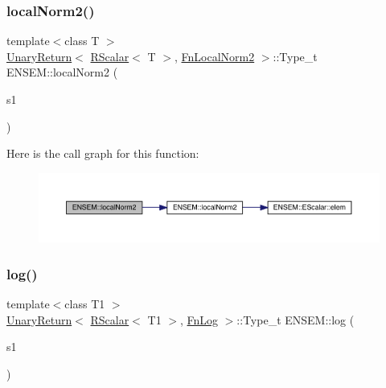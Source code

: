 \subsubsection{\texorpdfstring{localNorm2()}{localNorm2()}}
{\footnotesize\ttfamily template$<$class T $>$ \\
\mbox{\hyperlink{structENSEM_1_1UnaryReturn}{Unary\+Return}}$<$ \mbox{\hyperlink{classENSEM_1_1RScalar}{R\+Scalar}}$<$ T $>$, \mbox{\hyperlink{structENSEM_1_1FnLocalNorm2}{Fn\+Local\+Norm2}} $>$\+::Type\+\_\+t E\+N\+S\+E\+M\+::local\+Norm2 (\begin{DoxyParamCaption}\item[{const \mbox{\hyperlink{classENSEM_1_1RScalar}{R\+Scalar}}$<$ T $>$ \&}]{s1 }\end{DoxyParamCaption})\hspace{0.3cm}{\ttfamily [inline]}}

Here is the call graph for this function\+:\nopagebreak
\begin{figure}[H]
\begin{center}
\leavevmode
\includegraphics[width=350pt]{d9/ded/group__rscalar_ga3ca325ab0808bb3c4b966320b923c213_cgraph}
\end{center}
\end{figure}
\mbox{\label{group__rscalar_gacf4bc45f226554e38012a20a649605ed}} 
\subsubsection{\texorpdfstring{log()}{log()}}
{\footnotesize\ttfamily template$<$class T1 $>$ \\
\mbox{\hyperlink{structENSEM_1_1UnaryReturn}{Unary\+Return}}$<$ \mbox{\hyperlink{classENSEM_1_1RScalar}{R\+Scalar}}$<$ T1 $>$, \mbox{\hyperlink{structENSEM_1_1FnLog}{Fn\+Log}} $>$\+::Type\+\_\+t E\+N\+S\+E\+M\+::log (\begin{DoxyParamCaption}\item[{const \mbox{\hyperlink{classENSEM_1_1RScalar}{R\+Scalar}}$<$ T1 $>$ \&}]{s1 }\end{DoxyParamCaption})\hspace{0.3cm}{\ttfamily [inline]}}

